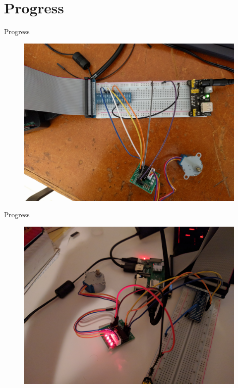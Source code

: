 \documentclass{beamer}
\begin{document}
\section{Progress}
\begin{frame}{Progress}
\begin{figure}
\includegraphics[scale=0.05]{figs/labStepper}
\end{figure}
\end{frame}

\begin{frame}{Progress}
\begin{figure}
\includegraphics[scale=0.05]{figs/homeStepperMotor}
\end{figure}
\end{frame}
\end{document}
